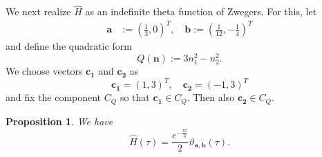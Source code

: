 \documentclass[12pt,reqno]{amsart}
\renewcommand{\r}{{\rho}}
\renewcommand{\t}{\tau}
\renewcommand{\(}{\left\(}
\renewcommand{\)}{\right\)}
\numberwithin{equation}{section}
\theoremstyle{plain}
\newtheorem{proposition}[theorem]{Proposition}
\theoremstyle{definition}
\numberwithin{equation}{section}
\begin{document}
We next realize $\widehat{H}$ as an indefinite theta function of Zwegers. For this, let 
\begin{align*}
\bm{a}&:=\left(\frac 13,0\right)^T,\quad \bm{b}:=\left(\frac{1}{12},-\frac 14\right)^T
\end{align*}
and define the quadratic form
\[
Q(\bm{n}):=3n^2_1-n^2_2.
\]
We choose vectors $\bm{c_1}$ and $\bm{c_2}$ as
\[
\bm{c_1}=(1,3)^T,\quad \bm{c_2}=(-1,3)^T
\]
and fix the component $C_{Q}$ so that $\bm{c_1}\in C_Q$. Then also $\bm{c_2}\in C_Q$.


\begin{proposition}\label{prop1}
We have
\[
\widehat{H}(\t)=\frac{e^{-\frac{\pi i}{3}}}{2}\vartheta_{\bm{a},\bm{b}}(\t).
\]
\end{proposition}
\end{document}
